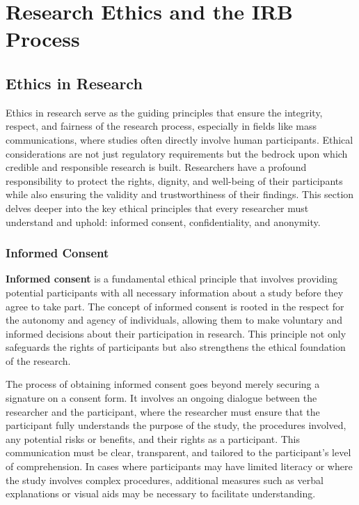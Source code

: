 \documentclass[
]{book}
\begin{document}
\section{Research Ethics and the IRB Process}\label{research-ethics-and-the-irb-process}

\subsection*{Ethics in Research}\label{ethics-in-research}

Ethics in research serve as the guiding principles that ensure the integrity, respect, and fairness of the research process, especially in fields like mass communications, where studies often directly involve human participants. Ethical considerations are not just regulatory requirements but the bedrock upon which credible and responsible research is built. Researchers have a profound responsibility to protect the rights, dignity, and well-being of their participants while also ensuring the validity and trustworthiness of their findings. This section delves deeper into the key ethical principles that every researcher must understand and uphold: informed consent, confidentiality, and anonymity.

\subsubsection*{Informed Consent}\label{informed-consent}

\textbf{Informed consent} is a fundamental ethical principle that involves providing potential participants with all necessary information about a study before they agree to take part. The concept of informed consent is rooted in the respect for the autonomy and agency of individuals, allowing them to make voluntary and informed decisions about their participation in research. This principle not only safeguards the rights of participants but also strengthens the ethical foundation of the research.

The process of obtaining informed consent goes beyond merely securing a signature on a consent form. It involves an ongoing dialogue between the researcher and the participant, where the researcher must ensure that the participant fully understands the purpose of the study, the procedures involved, any potential risks or benefits, and their rights as a participant. This communication must be clear, transparent, and tailored to the participant's level of comprehension. In cases where participants may have limited literacy or where the study involves complex procedures, additional measures such as verbal explanations or visual aids may be necessary to facilitate understanding.
\end{document}
